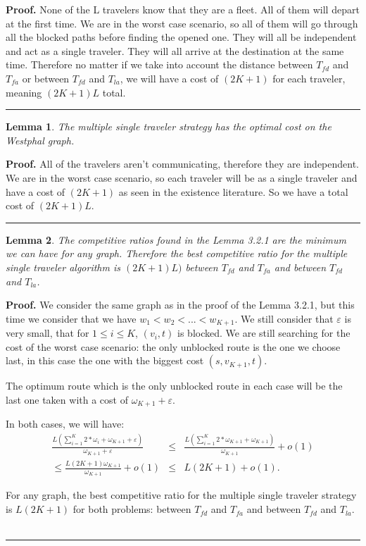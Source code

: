 \documentclass[letter-size, 11pt]{article}
\newtheorem{lemma}{Lemma}
\newenvironment{proof}[1][Proof]{\textbf{#1.} }{\ \rule{0.5em}{0.5em}}
\begin{document}
\begin{proof} None of the L travelers know that they are a fleet. All of them will depart at the first time. We are in the worst case scenario, so all of them will go through all the blocked paths before finding the opened one. They will all be independent and act as a single traveler. They will all arrive at the destination at the same time. Therefore no matter if we take into account the distance between $T_{fd}$ and $T_{fa}$ or between $T_{fd}$ and $T_{la}$, we will have a cost of $(2K+1)$ for each traveler, meaning $(2K+1)L$ total.
\end{proof}

\begin{lemma}The multiple single traveler strategy has the optimal cost on the Westphal graph.
\end{lemma}

\begin{proof} All of the travelers aren't communicating, therefore they are independent. We are in the worst case scenario, so each traveler will be as a single traveler and have a cost of $(2K+1)$ as seen in the existence literature. So we have a total cost of $(2K+1)L$.
\end{proof}

\begin {lemma} The competitive ratios found in the Lemma 3.2.1 are the minimum we can have for any graph. Therefore the best competitive ratio for the multiple single traveler algorithm is $(2K+1)L)$ between $T_{fd}$ and $T_{fa}$ and between $T_{fd}$ and $T_{la}$.
\end{lemma}

\begin {proof} We consider the same graph as in the proof of the Lemma 3.2.1, but this time we consider that we have $w_1 < w_2 < ... < w_{K+1}$. We still consider that $\varepsilon$ is very small, that for $1\leq i \leq K$, $(v_i,t)$ is blocked. We are still searching for the cost of the worst case scenario: the only unblocked route is the one we choose last, in this case the one with the biggest cost $(s,v_{K+1},t)$.

The optimum route which is the only unblocked route in each case will be the last one taken with a cost of $\omega_{K+1} + \varepsilon$.

In both cases, we will have:
\begin{eqnarray}
\frac {L(\sum_{i=1}^{K} 2*\omega_{i} + \omega_{K+1} + \varepsilon)} {\omega_{K+1} + \varepsilon} 
&\leq& \frac {L(\sum_{i=1}^{K} 2*\omega_{K+1} + \omega_{K+1})} {\omega_{K+1}} + o(1) \nonumber\\
\leq \frac {L(2K+1)\omega_{K+1} } {\omega_{K+1}} + o(1)
&\leq& L(2K+1) + o(1).\nonumber
\end{eqnarray}

For any graph, the best competitive ratio for the multiple single traveler strategy is $L(2K+1)$ for both problems: between $T_{fd}$ and $T_{fa}$ and between $T_{fd}$ and $T_{la}$.
\end{proof}
\end{document}
